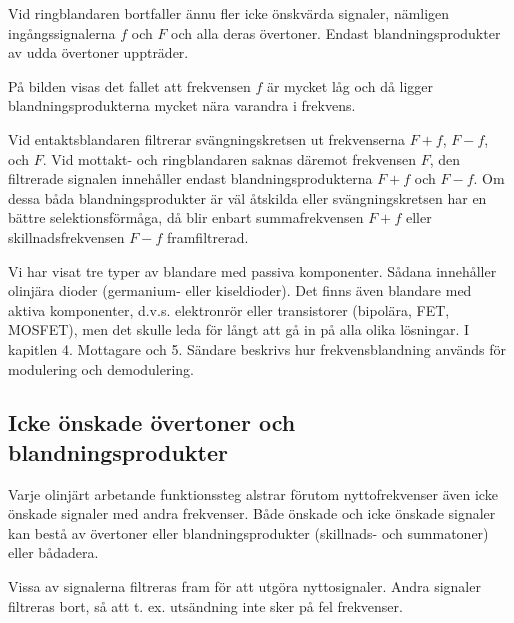 Vid ringblandaren bortfaller ännu fler icke önskvärda signaler,
nämligen ingångssignalerna \(f\) och \(F\) och alla deras övertoner.
Endast blandningsprodukter av udda övertoner uppträder.

På bilden visas det fallet att frekvensen \(f\) är mycket låg och då
ligger blandningsprodukterna mycket nära varandra i frekvens.

Vid entaktsblandaren filtrerar svängningskretsen ut frekvenserna \(F +
f\), \(F - f\), och \(F\). Vid mottakt- och ringblandaren saknas
däremot frekvensen \(F\), den filtrerade signalen innehåller endast
blandningsprodukterna \(F + f\) och \(F - f\). Om dessa båda
blandningsprodukter är väl åtskilda eller svängningskretsen har en
bättre selektionsförmåga, då blir enbart summafrekvensen \(F + f\)
eller skillnadsfrekvensen \(F - f\) framfiltrerad.

Vi har visat tre typer av blandare med passiva komponenter. Sådana
innehåller olinjära dioder (germanium- eller kiseldioder).  Det finns
även blandare med aktiva komponenter, d.v.s. elektronrör eller
transistorer (bipolära, FET, MOSFET), men det skulle leda för långt
att gå in på alla olika lösningar.  I kapitlen 4. Mottagare och
5. Sändare beskrivs hur frekvensblandning används för modulering och
demodulering.

\subsection{Icke önskade övertoner och blandningsprodukter}

Varje olinjärt arbetande funktionssteg alstrar förutom nyttofrekvenser
även icke önskade signaler med andra frekvenser. Både önskade och icke
önskade signaler kan bestå av övertoner eller blandningsprodukter
(skillnads- och summatoner) eller bådadera.

Vissa av signalerna filtreras fram för att utgöra nyttosignaler. Andra
signaler filtreras bort, så att t. ex. utsändning inte sker på fel
frekvenser.

